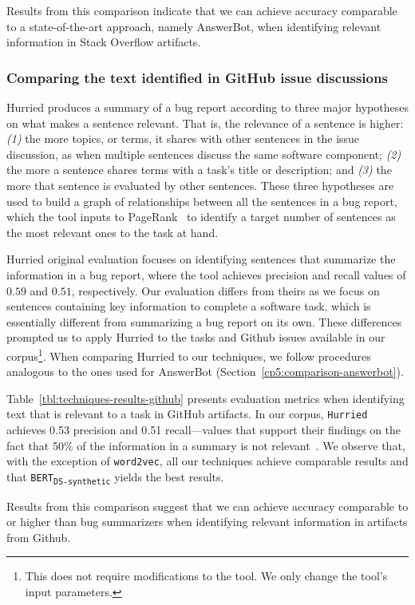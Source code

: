Results from this comparison indicate that we can achieve accuracy comparable  
to a state-of-the-art approach, namely AnswerBot, 
when identifying relevant information in Stack Overflow artifacts.






\subsubsection{Comparing the text identified in GitHub issue discussions}
\label{cp5:comparison-hurried}


\acs{Hurried} produces a summary of a bug report according to three major hypotheses on what makes a sentence relevant. 
That is, the relevance of a sentence is higher:
\textit{(1)} the more topics, or terms, it shares with other sentences  in the issue discussion, as when multiple sentences discuss the same software component;
\textit{(2)} the more a sentence shares terms with a task's title or description; and 
\textit{(3)} the more that sentence is evaluated by other sentences.
These three hypotheses are used to build a graph of relationships between all the sentences in a bug report, which 
the tool inputs to PageRank~\cite{Page1999} to identify a target number of sentences as the most 
 relevant ones to the task at hand. 



\acs{Hurried} original evaluation focuses on identifying sentences that summarize the information in a bug report, where the tool achieves precision and recall values of $0.59$ and $0.51$, respectively.
Our evaluation differs from theirs as we focus on sentences containing key information to complete a software task, which is essentially different from summarizing a bug report on its own. These differences prompted us to apply \acs{Hurried} to the tasks and Github issues available in our corpus\footnote{This does not require modifications to the tool. We only change the tool's input parameters.}. When comparing \acs{Hurried} to our techniques, we follow procedures analogous to the ones used for AnswerBot (Section~\ref{cp5:comparison-answerbot}).



Table~\ref{tbl:techniques-results-github} presents evaluation metrics when identifying text that is relevant to a task 
in GitHub artifacts. In our corpus, \texttt{Hurried} achieves 0.53 precision and 0.51 recall---values that support their findings on the fact that 50\% of the information in a summary is not relevant~\cite{Lotufo2012}.
We observe that, with the exception of \texttt{word2vec}, all our techniques achieve comparable results
and that \texttt{BERT\textsubscript{DS-synthetic}} yields the best results. 








Results from this comparison suggest that we can achieve accuracy comparable to or higher than 
bug summarizers when identifying relevant information in artifacts from Github.





